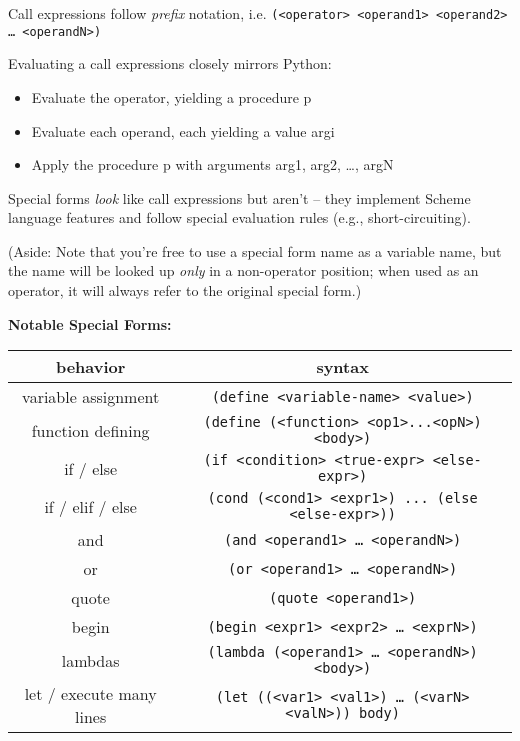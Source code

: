 Call expressions follow \textit{prefix} notation, i.e.
\texttt{(<operator> <operand1> <operand2> … <operandN>)}

Evaluating a call expressions closely mirrors Python:
\begin{itemize}
\item Evaluate the operator, yielding a procedure p
\item Evaluate each operand, each yielding a value argi
\item Apply the procedure p with arguments arg1, arg2, …, argN
\end{itemize}

Special forms \textit{look} like call expressions but aren’t -- they implement Scheme language features and follow special evaluation rules (e.g., short-circuiting). 

(Aside: Note that you’re free to use a special form name as a variable name, but the name will be looked up \textit{only} in a non-operator position; when used as an operator, it will always refer to the original special form.)

\textbf{Notable Special Forms:}
\begin{center}
\begin{tabular}{ |c|c| }
    \hline
    behavior & syntax \\
    \hline
    variable assignment   & \texttt{(define <variable-name> <value>)} \\
    \hline
    function defining & \texttt{(define (<function> <op1>...<opN>) <body>)} \\
    \hline
    if / else & \texttt{(if <condition> <true-expr> <else-expr>)} \\
    \hline
    if / elif / else & \texttt{(cond (<cond1> <expr1>) ... (else <else-expr>))} \\
    \hline
    and & \texttt{(and <operand1> … <operandN>)} \\
    \hline
    or & \texttt{(or <operand1> … <operandN>)} \\
    \hline
    quote & \texttt{(quote <operand1>)} \\
    \hline
    begin & \texttt{(begin <expr1> <expr2> … <exprN>)} \\
    \hline
    lambdas & \texttt{(lambda (<operand1> … <operandN>) <body>)} \\
    \hline
    let / execute many lines & \texttt{(let ((<var1> <val1>) … (<varN> <valN>)) body)} \\
    \hline
\end{tabular}
\end{center}
